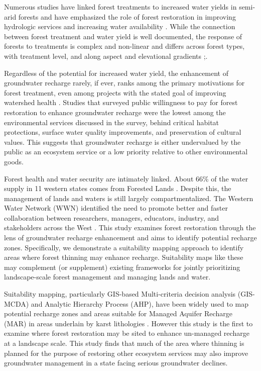 \documentclass[
  number,
  preprint,
  3p,
  onecolumn]{elsarticle}
\begin{document}
Numerous studies have linked forest treatments to increased water yields
in semi-arid forests and have emphasized the role of forest restoration
in improving hydrologic services and increasing water availability
\citep{bosch1982, baker_effects_1986, gottfried_moderate_1991, smerdon_overview_2009, zou_streamflow_2010, wyatt2013, moreno_modeling_2015, simonit_impact_2015, wyatt2015, odonnell_forest_2018, schenk_impacts_2020, hibbert1979}.
While the connection between forest treatment and water yield is well
documented, the response of forests to treatments is complex and
non-linear and differs across forest types, with treatment level, and
along aspect and elevational gradients
\citep{del_campo_global_2022, biederman2022, zou_streamflow_2010, hibbert1979, moore2005};.

Regardless of the potential for increased water yield, the enhancement
of groundwater recharge rarely, if ever, ranks among the primary
motivations for forest treatment, even among projects with the stated
goal of improving watershed health
\citep{stanturf2014, filoso2017, allen2002, friederici2013, odonnell2016}.
Studies that surveyed public willingness to pay for forest restoration
to enhance groundwater recharge were the lowest among the environmental
services discussed in the survey, behind critical habitat protections,
surface water quality improvements, and preservation of cultural
values\citep{mueller2019, soder2022}. This suggests that groundwater
recharge is either undervalued by the public as an ecosystem service or
a low priority relative to other environmental goods.

Forest health and water security are intimately linked. About 66\% of
the water supply in 11 western states comes from Forested Lands
\citep{brown_source_2005}. Despite this, the management of lands and
waters is still largely compartmentalized. The Western Water Network
(WWN) identified the need to promote better and faster collaboration
between researchers, managers, educators, industry, and stakeholders
across the West \citep{hansen2024}. This study examines forest
restoration through the lens of groundwater recharge enhancement and
aims to identify potential recharge zones. Specifically, we demonstrate
a suitability mapping approach to identify areas where forest thinning
may enhance recharge. Suitability maps like these may complement (or
supplement) existing frameworks for jointly prioritizing landscape-scale
forest management and managing lands and water.

Suitability mapping, particularly GIS-based Multi-criteria decision
analysis (GIS-MCDA) and Analytic Hierarchy Process (AHP), have been
widely used to map potential recharge zones and areas suitable for
Managed Aquifer Recharge (MAR) in areas underlain by karst lithologies
\citep{fathi2021, rajashekar2023, rahman2012, dar2020, shaban2006}.
However this study is the first to examine where forest restoration may
be sited to enhance un-managed recharge at a landscape scale. This study
finds that much of the area where thinning is planned for the purpose of
restoring other ecosystem services may also improve groundwater
management in a state facing serious groundwater declines.
\end{document}
